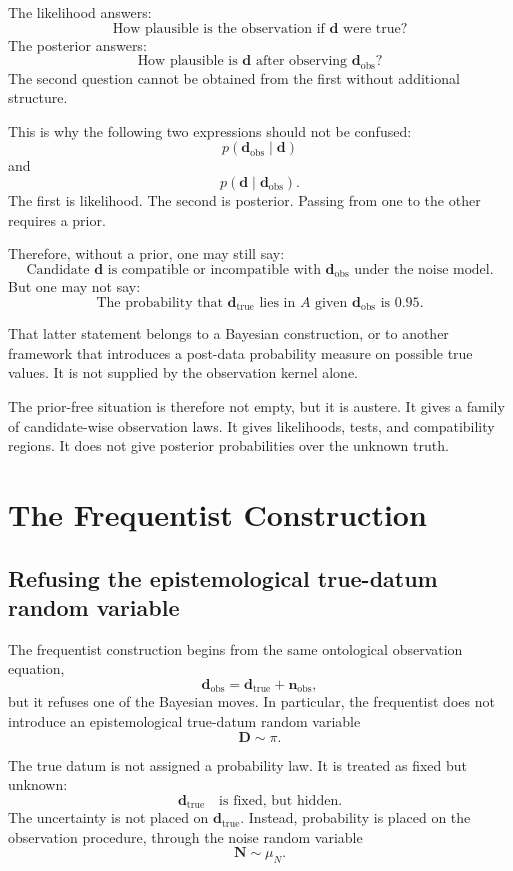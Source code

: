 \documentclass[11pt]{article}
\newcommand{\muN}{\mu_N}
\newcommand{\prior}{\pi}
\newcommand{\Drand}{\mathbf D}
\newcommand{\Nrand}{\mathbf N}
\newcommand{\dtrue}{\mathbf d_{\mathrm{true}}}
\newcommand{\dobs}{\mathbf d_{\mathrm{obs}}}
\newcommand{\nobs}{\mathbf n_{\mathrm{obs}}}
\begin{document}
The likelihood answers:
\[
    \text{How plausible is the observation if } \mathbf d \text{ were true?}
\]
The posterior answers:
\[
    \text{How plausible is } \mathbf d \text{ after observing } \dobs?
\]
The second question cannot be obtained from the first without additional structure.

This is why the following two expressions should not be confused:
\[
    p(\dobs\mid \mathbf d)
\]
and
\[
    p(\mathbf d\mid \dobs).
\]
The first is likelihood. The second is posterior. Passing from one to the other requires a prior.

Therefore, without a prior, one may still say:
\[
    \text{Candidate } \mathbf d
    \text{ is compatible or incompatible with } \dobs
    \text{ under the noise model.}
\]
But one may not say:
\[
    \text{The probability that } \dtrue
    \text{ lies in } A
    \text{ given } \dobs
    \text{ is } 0.95.
\]

That latter statement belongs to a Bayesian construction, or to another framework that introduces a post-data probability measure on possible true values. It is not supplied by the observation kernel alone.

The prior-free situation is therefore not empty, but it is austere. It gives a family of candidate-wise observation laws. It gives likelihoods, tests, and compatibility regions. It does not give posterior probabilities over the unknown truth.


\section{The Frequentist Construction}

\subsection{Refusing the epistemological true-datum random variable}

The frequentist construction begins from the same ontological observation equation,
\[
    \dobs=\dtrue+\nobs,
\]
but it refuses one of the Bayesian moves. In particular, the frequentist does not introduce an epistemological true-datum random variable
\[
    \Drand\sim\prior.
\]

The true datum is not assigned a probability law. It is treated as fixed but unknown:
\[
    \dtrue
    \quad
    \text{is fixed, but hidden.}
\]
The uncertainty is not placed on \(\dtrue\). Instead, probability is placed on the observation procedure, through the noise random variable
\[
    \Nrand\sim\muN.
\]
\end{document}
